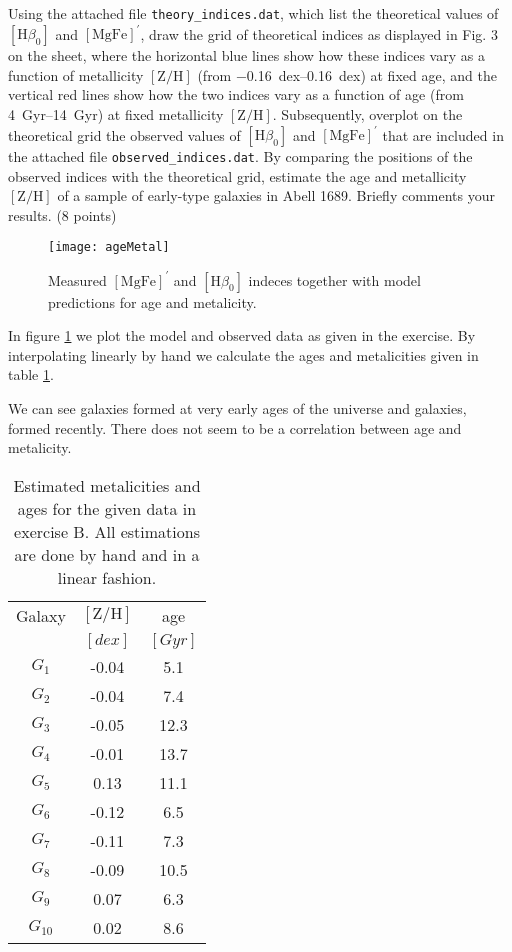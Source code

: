 \documentclass[11pt,a4paper,twoside]{article}
\newcommand{\MgFe}{\ensuremath{[\text{MgFe}]^\prime} }
\newcommand{\ZH}{\ensuremath{[\text{Z}/\text{H}]} }
\newcommand{\Hbo}{\ensuremath{[\text{H}\beta_0]} }
\begin{document}
Using the attached file \verb+theory_indices.dat+, which list the theoretical 
values of $\Hbo$ and $\MgFe$, draw the grid of theoretical indices as 
displayed in Fig. 3 on the sheet, where the horizontal blue lines show how 
these indices vary as a function of metallicity $\ZH$ (from 
\SIrange{-0.16}{0.16}{dex}) at fixed age, and the vertical red lines show how 
the two indices vary as a function of age (from \SIrange{4}{14}{Gyr}) 
at fixed metallicity $\ZH$. Subsequently, overplot on the theoretical grid 
the observed values of $\Hbo$ and $\MgFe$ that are included in the attached 
file \verb+observed_indices.dat+. By comparing the positions of the observed 
indices with the theoretical grid, estimate the age and metallicity $\ZH$ of 
a sample of early-type galaxies in Abell 1689. Briefly comments your results. 
(8 points) \\

\begin{figure}[h!]
\centering
\texttt{[image: ageMetal]}
\caption{Measured \MgFe and \Hbo indeces together with model predictions
for age and metalicity.}
\label{fig:am}
\end{figure}
In figure \ref{fig:am} we plot the model and observed data as given in the
exercise. By interpolating linearly by hand we calculate the ages and
metalicities given in table \ref{tab:am}.  

We can see galaxies formed at very early ages of the universe and galaxies,
formed recently. There does not seem to be a correlation between age and 
metalicity.

\begin{table}[h!]
\centering
\begin{tabular}{ccc}\toprule
Galaxy  & \ZH           & age               \\
        & $[\si{dex}]$  & $[\si{Gyr}]$      \\ \midrule
$G_1$   & -0.04         & 5.1				\\
$G_2$   & -0.04	        & 7.4				\\
$G_3$   & -0.05	        & 12.3				\\
$G_4$   & -0.01	        & 13.7				\\
$G_5$   & 0.13	        & 11.1				\\
$G_6$   & -0.12	        & 6.5				\\
$G_7$   & -0.11	        & 7.3				\\
$G_8$   & -0.09	        & 10.5				\\
$G_9$   & 0.07	        & 6.3				\\
$G_{10}$& 0.02	        & 8.6				\\
\bottomrule
\end{tabular}
\caption{Estimated metalicities and ages for the given data in
exercise B. All estimations are done by hand and in a linear 
fashion.}
\label{tab:am}
\end{table}
\end{document}
